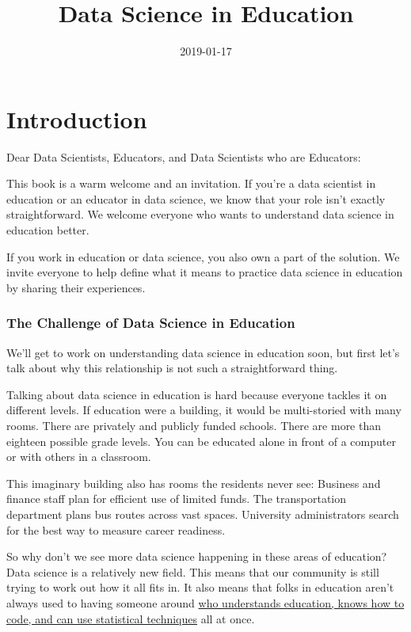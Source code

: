 \documentclass[]{book}
\title{Data Science in Education}
\author{}
\date{2019-01-17}
\begin{document}
\maketitle

{
\setcounter{tocdepth}{1}
\tableofcontents
}
\chapter{Introduction}\label{introduction}

Dear Data Scientists, Educators, and Data Scientists who are Educators:

This book is a warm welcome and an invitation. If you're a data
scientist in education or an educator in data science, we know that your
role isn't exactly straightforward. We welcome everyone who wants to
understand data science in education better.

If you work in education or data science, you also own a part of the
solution. We invite everyone to help define what it means to practice
data science in education by sharing their experiences.

\subsection{The Challenge of Data Science in
Education}\label{the-challenge-of-data-science-in-education}

We'll get to work on understanding data science in education soon, but
first let's talk about why this relationship is not such a
straightforward thing.

Talking about data science in education is hard because everyone tackles
it on different levels. If education were a building, it would be
multi-storied with many rooms. There are privately and publicly funded
schools. There are more than eighteen possible grade levels. You can be
educated alone in front of a computer or with others in a classroom.

This imaginary building also has rooms the residents never see: Business
and finance staff plan for efficient use of limited funds. The
transportation department plans bus routes across vast spaces.
University administrators search for the best way to measure career
readiness.

So why don't we see more data science happening in these areas of
education? Data science is a relatively new field. This means that our
community is still trying to work out how it all fits in. It also means
that folks in education aren't always used to having someone around
\href{http://drewconway.com/zia/2013/3/26/the-data-science-venn-diagram}{who
understands education, knows how to code, and can use statistical
techniques} all at once.
\end{document}
